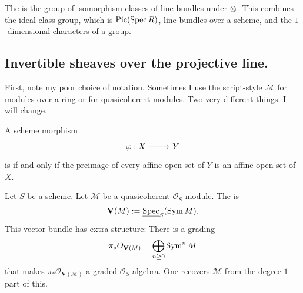 \documentclass [11 pt, oneside] {article}
\begin{document}
The  is the group of isomorphism classes of line bundles under $\otimes$. This combines the ideal class group, which is $\operatorname{Pic}(\operatorname{Spec} R)$, line bundles over a scheme, and the $1$-dimensional characters of a group.

\subsection{Invertible sheaves over the projective line.}
First, note my poor choice of notation. Sometimes I use the script-style $\mathscr{M}$ for modules over a ring or for quasicoherent modules. Two very different things. I will change.

\begin{definition}\label{}\text{}
A scheme morphism 
\[
\begin{tikzcd}
\varphi:X\ar[r]&Y
\end{tikzcd}
\]
is  if and only if the preimage of every affine open set of $Y$ is an affine open set of $X$.
\end{definition}

\begin{definition}\label{}\text{}
Let $S$ be a scheme. Let $\mathscr{M}$ be a quasicoherent $\mathscr{O}_S$-module. The  is
\begin{align*}
	\mathbf{V}(\relax{M}) := \underline{\operatorname{Spec}}_S(\operatorname{Sym} \relax{M}).
\end{align*}
This vector bundle has extra structure: There is a grading
\begin{align*}
	\pi_* \relax{O}_{\mathbf{V}(\relax{M})} = \bigoplus_{n\ge 0}\operatorname{Sym} ^n \relax{M}
\end{align*}
that makes $\pi_*\mathscr{O}_{\mathbf{V}(\mathscr{M})}$ a graded $\mathscr{O}_S$-algebra. One recovers $\mathscr{M}$ from the degree-$1$ part of this. 
\end{definition}
\end{document}
